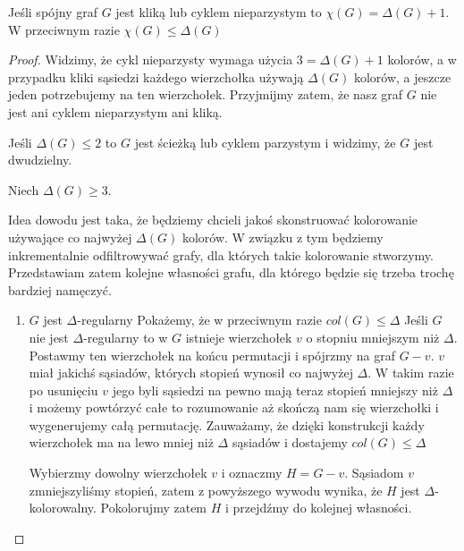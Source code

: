     \begin{theorem}[Brooks]
        Jeśli spójny graf $G$ jest kliką lub cyklem nieparzystym to $\chi(G) = \Delta(G) + 1$.
        W przeciwnym razie $\chi(G) \leq \Delta(G)$
    \end{theorem}
   
    \begin{proof}
        Widzimy, że cykl nieparzysty wymaga użycia $3 = \Delta(G) + 1$ kolorów,
        a w przypadku kliki sąsiedzi każdego wierzchołka używają $\Delta(G)$ kolorów, a jeszcze jeden potrzebujemy na ten wierzchołek. Przyjmijmy zatem, że nasz graf $G$ nie jest 
        ani cyklem nieparzystym ani kliką. 
        
        Jeśli $\Delta(G) \leq 2$ to $G$ jest ścieżką lub cyklem parzystym i widzimy, że $G$ jest dwudzielny. 
        
        Niech $\Delta(G) \geq 3$. 
        
        Idea dowodu jest taka, że będziemy chcieli jakoś skonstruować kolorowanie używające co najwyżej $\Delta(G)$ kolorów. W związku z tym będziemy inkrementalnie odfiltrowywać grafy, dla których takie kolorowanie stworzymy.
        Przedstawiam zatem kolejne własności grafu, dla którego będzie się trzeba trochę bardziej namęczyć.
        
        \begin{enumerate}
            \item $G$ jest $\Delta$-regularny 
                Pokażemy, że w przeciwnym razie $col(G) \leq \Delta$ 
                Jeśli $G$ nie jest $\Delta$-regularny to w $G$ istnieje wierzchołek $v$ o stopniu mniejszym niż $\Delta$.
                Postawmy ten wierzchołek na końcu permutacji i spójrzmy na graf $G - v$. 
                $v$ miał jakichś sąsiadów, których stopień wynosił co najwyżej $\Delta$.
                W takim razie po usunięciu $v$ jego byli sąsiedzi na pewno mają teraz stopień mniejszy niż $\Delta$ 
                i możemy powtórzyć całe to rozumowanie aż skończą nam się wierzchołki i wygenerujemy całą permutację.
                Zauważamy, że dzięki konstrukcji każdy wierzchołek ma na lewo mniej niż $\Delta$ sąsiadów i dostajemy $col(G) \leq \Delta$ 
            
                Wybierzmy dowolny wierzchołek $v$ i oznaczmy $H = G - v$.
                Sąsiadom $v$ zmniejszyliśmy stopień, zatem z powyższego wywodu wynika, że $H$ jest $\Delta$-kolorowalny.
                Pokolorujmy zatem $H$ i przejdźmy do kolejnej własności.
                

\end{enumerate}
\end{proof}
